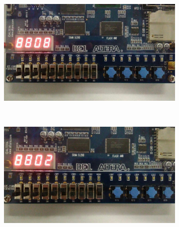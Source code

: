 \begin{figure}[H]
		\begin{subfigure}[b]{0.44\textwidth}
			\includegraphics[width=\textwidth]{img/etapa3/5}
			\label{fig:etapa3-14}
		\end{subfigure}
		~
		\begin{subfigure}[b]{0.44\textwidth}
			\includegraphics[width=\textwidth]{img/etapa3/6}
			\label{fig:etapa3-15}
		\end{subfigure}


\end{figure}
